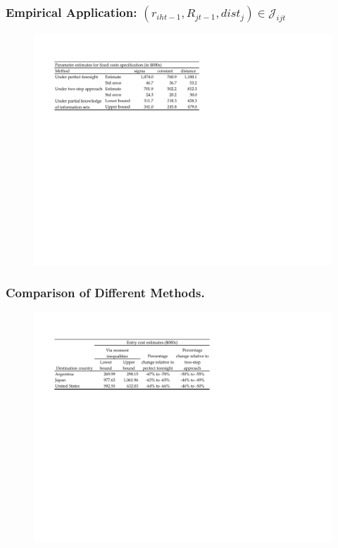 \documentclass[10pt,letterpaper]{beamer}
\begin{document}
\begin{frame}
\frametitle{Empirical Application: $(r_{iht-1},R_{jt-1},dist_{j})\in\mathcal{J}_{ijt}$}

\begin{figure}[h]
\centering\includegraphics[width=1\linewidth]{parm_est_all.pdf}
\end{figure}

\end{frame}

\begin{frame}
\frametitle{Comparison of Different Methods.}

\begin{figure}[h]
\centering\includegraphics[width=1\linewidth]{entry_cost_compare}
\end{figure}

\end{frame}
\end{document}
